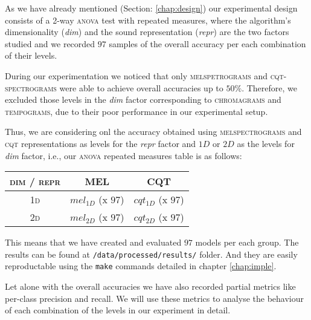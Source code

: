 \label{chap:discussion}

As we have already mentioned (Section: \ref{chap:design}) our experimental design consists of a 2-way \textsc{anova} test with repeated measures, where the algorithm's dimensionality ({\it dim}) and the sound representation ({\it repr}) are the two factors studied and we recorded $97$ samples of the overall accuracy per each combination of their levels.

During our experimentation we noticed that only \textsc{melspetrograms} and \textsc{cqt-spectrograms} were able to achieve overall accuracies up to $50\%$. Therefore, we excluded those levels in the {\it dim} factor corresponding to \textsc{chromagrams} and \textsc{ tempograms}, due to their poor performance in our experimental setup.

Thus, we are considering onl the accuracy obtained using \textsc{melspectrograms} and \textsc{cqt} representations as levels for the {\it repr} factor and $1D$ or $2D$ as the levels for {\it dim} factor, i.e., our \textsc{anova} repeated measures table is as follows:

\begin{center}

  \begin{tabular}{c|c|c}

    \textsc{dim / repr} & \textsc{MEL} & \textsc{CQT} \\
    \hline
    \hline

    \textsc{1d} & $mel_{1D}$ (x $97$) & $cqt_{1D}$ (x $97$) \\
    \textsc{2d} & $mel_{2D}$ (x $97$) & $cqt_{2D}$ (x $97$) \\

  \end{tabular}


  \label{tab:anovadescription}

\end{center}

This means that we have created and evaluated $97$ models per each group. The results can be found at \texttt{/data/processed/results/} folder. And they are easily reproductable using the \texttt{make} commands detailed in chapter \ref{chap:imple}.

Let alone with the overall accuracies we have also recorded partial metrics like per-class precision and recall. We will use these metrics to analyse the behaviour of each combination of the levels in our experiment in detail.

